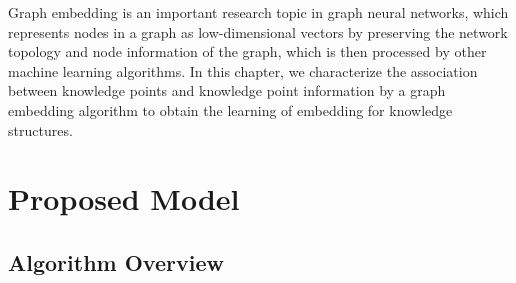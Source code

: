 Graph embedding is an important research topic in graph neural networks, which represents nodes in a graph as low-dimensional vectors by preserving the network topology and node information of the graph, which is then processed by other machine learning algorithms. In this chapter, we characterize the association between knowledge points and knowledge point information by a graph embedding algorithm to obtain the learning of embedding for knowledge structures.



\section{Proposed Model}
\subsection{Algorithm Overview}

